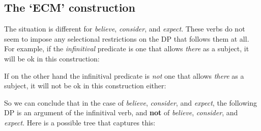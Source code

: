 \documentclass{article}
\begin{document}
\subsection{The `ECM'  construction}
The situation is different for \emph{believe}, \emph{consider}, and \emph{expect}.
These verbs do not seem to impose any selectional restrictions on the DP that follows them at all. 
For example, if the \emph{infinitival} predicate is one that allows \emph{there} as a subject, it will be ok in this construction:
\begin{exe}
\end{exe}
If on the other hand the infinitival predicate is \emph{not} one that allows \emph{there} as a subject, it will not be ok in this construction either:
\begin{exe}
    \label{joshuathere}
\end{exe}
So we can conclude that in the case of \emph{believe}, \emph{consider}, and \emph{expect}, the following DP is an argument of the infinitival verb, and \textbf{not} of \emph{believe}, \emph{consider}, and \emph{expect}.
Here is a possible tree that captures this:
\begin{exe}
    \label{believe-tree}
\end{exe}
\end{document}
